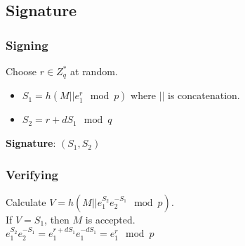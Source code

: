 \documentclass{report}
\begin{document}
		\subsection{Signature}
			\subsubsection{Signing}
				Choose $r \in Z_q^*$ at random.
				\begin{itemize}
					\item $S_1=h(M||e_1^r \mod p)$ where $||$ is concatenation.
					\item $S_2=r+dS_1 \mod q$
				\end{itemize}
				\textbf{Signature}: $(S_1,S_2)$
			
			\subsubsection{Verifying}
				Calculate $V=h(M||e_1^{S_2}e_2^{-S_1} \mod p)$.\\
				If $V=S_1$, then $M$ is accepted.\\
				\begin{math}
					e_1^{S_2}e_2^{-S_1}=e_1^{r+dS_1}e_1^{-dS_1}=e_1^r \mod p
				\end{math}
\end{document}

